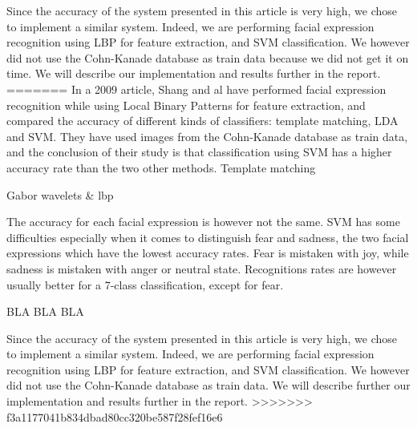 \noindent Since the accuracy of the system presented in this article is very high, we chose to implement a similar system. Indeed, we are performing facial expression recognition using LBP for feature extraction, and SVM classification. We however did not use the Cohn-Kanade database as train data because we did not get it on time. We will describe our implementation and results further in the report. 
=======
\noindent In a 2009 article, Shang and al \cite{SHA09} have performed facial expression recognition while using Local Binary Patterns for feature extraction, and compared the accuracy of different kinds of classifiers:  template matching,  LDA and SVM. They have used images from the Cohn-Kanade database as train data, and the conclusion of their study is that classification using SVM has a higher accuracy rate than the two other methods. Template matching 
\newline

\noindent Gabor wavelets \& lbp
\newline

\noindent The accuracy for each facial expression is however not the same. SVM has some difficulties especially when it comes to distinguish fear and sadness, the two facial expressions which have the lowest accuracy rates. Fear is mistaken with joy, while sadness is mistaken with anger or neutral state. Recognitions rates are however usually better for a 7-class classification, except for fear.
\newline

\noindent BLA BLA BLA
\newline

\noindent Since the accuracy of the system presented in this article is very high, we chose to implement a similar system. Indeed, we are performing facial expression recognition using LBP for feature extraction, and SVM classification. We however did not use the Cohn-Kanade database as train data. We will describe further our implementation and results further in the report. 
>>>>>>> f3a1177041b834dbad80cc320be587f28fef16e6
\newline

